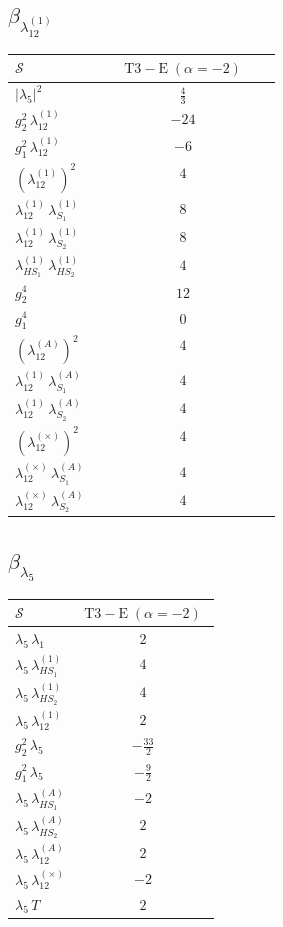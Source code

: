\documentclass[9pt]{article}
\begin{document}
\subsection*{$ \beta_{\lambda_{12}^{(1)}} $}
\begin{longtable}{@{}p{0.31\linewidth}c@{}}
\toprule
$\mathcal{S}$ & $ \mathrm{T3-E}\;(\alpha=-2) $ \\
\midrule
$ |\lambda_5|^2 $ & $ \frac{4}{3} $ \\
$ g_2^2\,\lambda_{12}^{(1)} $ & $ -24 $ \\
$ g_1^2\,\lambda_{12}^{(1)} $ & $ -6 $ \\
$ \left(\lambda_{12}^{(1)}\right)^2 $ & $ 4 $ \\
$ \lambda_{12}^{(1)}\,\lambda_{S_1}^{(1)} $ & $ 8 $ \\
$ \lambda_{12}^{(1)}\,\lambda_{S_2}^{(1)} $ & $ 8 $ \\
$ \lambda_{HS_1}^{(1)}\,\lambda_{HS_2}^{(1)} $ & $ 4 $ \\
$ g_2^4 $ & $ 12 $ \\
$ g_1^4 $ & $ 0 $ \\
$ \left(\lambda_{12}^{(A)}\right)^2 $ & $ 4 $ \\
$ \lambda_{12}^{(1)}\,\lambda_{S_1}^{(A)} $ & $ 4 $ \\
$ \lambda_{12}^{(1)}\,\lambda_{S_2}^{(A)} $ & $ 4 $ \\
$ \left(\lambda_{12}^{(\times)}\right)^2 $ & $ 4 $ \\
$ \lambda_{12}^{(\times)}\,\lambda_{S_1}^{(A)} $ & $ 4 $ \\
$ \lambda_{12}^{(\times)}\,\lambda_{S_2}^{(A)} $ & $ 4 $ \\
\bottomrule
\end{longtable}
\subsection*{$ \beta_{\lambda_5} $}
\begin{longtable}{@{}p{0.31\linewidth}c@{}}
\toprule
$\mathcal{S}$ & $ \mathrm{T3-E}\;(\alpha=-2) $ \\
\midrule
$ \lambda_5\,\lambda_1 $ & $ 2 $ \\
$ \lambda_5\,\lambda_{HS_1}^{(1)} $ & $ 4 $ \\
$ \lambda_5\,\lambda_{HS_2}^{(1)} $ & $ 4 $ \\
$ \lambda_5\,\lambda_{12}^{(1)} $ & $ 2 $ \\
$ g_2^2\,\lambda_5 $ & $ - \frac{33}{2} $ \\
$ g_1^2\,\lambda_5 $ & $ - \frac{9}{2} $ \\
$ \lambda_5\,\lambda_{HS_1}^{(A)} $ & $ -2 $ \\
$ \lambda_5\,\lambda_{HS_2}^{(A)} $ & $ 2 $ \\
$ \lambda_5\,\lambda_{12}^{(A)} $ & $ 2 $ \\
$ \lambda_5\,\lambda_{12}^{(\times)} $ & $ -2 $ \\
$ \lambda_5\,T $ & $ 2 $ \\
\bottomrule
\end{longtable}
\end{document}

